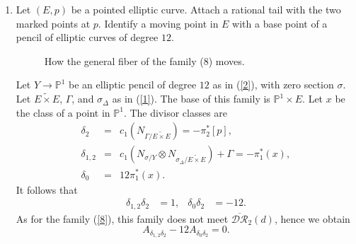\documentclass[10pt]{amsart}
\theoremstyle{definition}
\begin{document}
{\begin{enumerate}
 \begin{figure}[htbp]
\centering
  
  

  \caption{How the general fiber of the family (7) moves.}
\end{figure}

Suppose there exists an admissible cover for a fiber of this family, totally ramified at the two marked points. Then, the restriction of the cover to the rational component is totally ramified at the two marked points and has at least a simple ramification at the singular point, a contradiction.
 It follows that the family is disjoint from $\overline{\mathcal{DR}}_2(d)$. The divisor classes restrict as follows
\begin{eqnarray*}
 \delta_2 &=& {}-3H +\Sigma -E_0,\\
 \delta_{1,2} &=& {}-3H +\Sigma, \\
 \delta_0 &=& 36 H-12\Sigma
\end{eqnarray*}
(see also \cite[\S 3 ($\lambda$)]{MR1078265}). Hence, we obtain
\begin{align*}
\delta_2^2 = \delta_{1,2}\delta_2 &=1, & \delta_0\delta_2 &=-12,
\end{align*}
and
\[
 A_{\delta_2^2}+A_{\delta_{1,2}\delta_2} -12A_{\delta_0\delta_2}=0.
\]

\item Let $(E,p)$ be a pointed elliptic curve. Attach a rational tail with the two marked points at $p$. Identify a moving point in $E$ with a base point of a pencil of elliptic curves of degree $12$.

\begin{figure}[htbp]
\centering
  
  

  \caption{How the general fiber of the family (8) moves.}
\end{figure}

Let $Y\rightarrow \mathbb{P}^1$ be an elliptic pencil of degree $12$ as in (\ref{2}), with zero section $\sigma$.
Let $\widetilde{E\times E}$, $\Gamma$, and $\sigma_{\Delta}$ as in (\ref{1}). 
The base of this family is $\mathbb{P}^1\times E$. 
Let $x$ be the class of a point in $\mathbb{P}^1$.
The divisor classes are
\begin{eqnarray*}
 \delta_2 &=& c_1\left(N_{\Gamma/\widetilde{E\times E}} \right)= -\pi_2^*[p],\\
\delta_{1,2} &=& c_1\left(N_{\sigma/Y}\otimes N_{\sigma_{\Delta}/\widetilde{E\times E}} \right) + \Gamma = -\pi_1^*(x),\\
\delta_0 &=& 12 \pi_1^*(x).
\end{eqnarray*}
It follows that
\begin{align*}
\delta_{1,2}\delta_2 &= 1, & \delta_0\delta_2 &= -12.
\end{align*}
As for the family (\ref{8}), this family does not meet $\overline{\mathcal{DR}}_2(d)$, hence we obtain
\[
 A_{\delta_{1,2}\delta_2}-12A_{\delta_0\delta_2}=0.
\]


\end{enumerate}}
\end{document}
